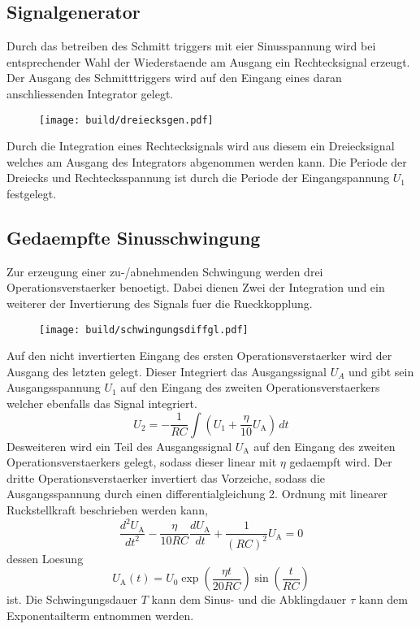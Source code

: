 \subsection{Signalgenerator}%
\label{sub:signalgenerator}
Durch das betreiben des Schmitt triggers mit eier Sinusspannung wird bei
entsprechender Wahl der Wiederstaende am Ausgang ein Rechtecksignal erzeugt.
Der Ausgang des Schmitttriggers wird auf den Eingang eines daran anschliessenden
Integrator gelegt. 
\begin{figure}[h]
		\centering
		\texttt{[image: build/dreiecksgen.pdf]}
		\caption{ \cite{anleitung}}
		\label{fig:}
\end{figure}
Durch die Integration eines Rechtecksignals wird aus diesem ein Dreiecksignal
welches am Ausgang des Integrators abgenommen werden kann.
Die Periode der Dreiecks und Rechtecksspannung ist durch die Periode der
Eingangspannung $U_1$ festgelegt.

\subsection{Gedaempfte Sinusschwingung}%
\label{sub:gedaempfte_sinusschwingung}
Zur erzeugung einer zu-/abnehmenden Schwingung werden drei Operationsverstaerker
benoetigt.
Dabei dienen Zwei der Integration und ein weiterer der Invertierung
des Signals fuer die Rueckkopplung.
\begin{figure}[h]
		\centering
		\texttt{[image: build/schwingungsdiffgl.pdf]}
		\caption{ \cite{anleitung}}
		\label{fig:}
\end{figure}

Auf den nicht invertierten Eingang des ersten Operationsverstaerker wird der
Ausgang des letzten gelegt.
Dieser Integriert das Ausgangssignal $U_A$ und gibt sein Ausgangsspannung $U_1$ auf
den Eingang des zweiten Operationsverstaerkers welcher ebenfalls das Signal
integriert.
\begin{equation}
		\label{eq:ov2}
		U_2 = - \frac{1}{RC} \int \left( U_1 + \frac{\eta}{10} U_\text{A} \right) \, dt
\end{equation}
Desweiteren wird ein Teil des Ausgangssignal $U_\text{A}$ auf den Eingang des
zweiten Operationsverstaerkers gelegt, sodass dieser linear mit $\eta$ gedaempft wird.
Der dritte Operationsverstaerker invertiert das Vorzeiche, sodass die
Ausgangsspannung durch einen differentialgleichung 2. Ordnung mit linearer
Ruckstellkraft beschrieben werden kann,
\begin{equation}
		\label{eq:schwingung_diff}
		\frac{d^2 U_\text{A}}{dt^2} - \frac{\eta}{10 R C} \frac{d
		U_\text{A}}{dt} + \frac{1}{(RC)^2} U_\text{A} = 0
\end{equation}
dessen Loesung 
\begin{equation}
		U_\text{A}(t) = U_0 \exp \left( \frac{\eta t}{20 RC} \right) 
		\sin \left(\frac{t}{RC}\right)
\end{equation}
ist.
Die Schwingungsdauer $T$ kann dem Sinus- und die Abklingdauer $\tau$ kann dem
Exponentailterm entnommen werden.
